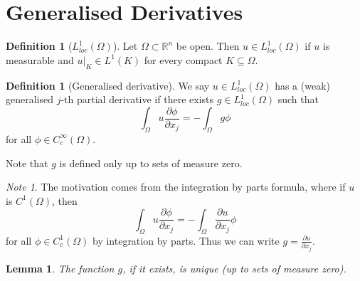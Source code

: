 \documentclass[10pt, oneside, reqno]{amsart}
\theoremstyle{plain}%
\newtheorem{lem}[thm]{Lemma}
\numberwithin{equation}{section}
\theoremstyle{definition}
\newtheorem{defn}[thm]{Definition}
\theoremstyle{remark}
\newtheorem*{note}{Note}
\newcommand{\R}{\mathbb{R}}
\begin{document}
\section{Generalised Derivatives} %
\label{sec:generalised_derivatives}

\begin{defn}[$L^1_{loc}(\Omega)$]
	Let $\Omega \subset \R^n$ be open.  Then $u \in L^1_{loc}(\Omega)$ if $u$ is measurable and $u|_K \in L^1(K)$ for every compact $K \subseteq \Omega$. 
\end{defn}

\begin{defn}[Generalised derivative]
	We say $u \in L^1_{loc}(\Omega)$ has a (weak) generalised $j$-th partial derivative if there exists $g \in L^1_{loc}(\Omega)$ such that \begin{equation}
	\label{eq:generalised_derivative}
		\int_\Omega u \frac{\partial \phi}{\partial x_j} = - \int_\Omega g \phi
	\end{equation}
	for all $\phi \in C_c^\infty(\Omega)$.
	
	Note that $g$ is defined only up to sets of measure zero.
\end{defn}

\begin{note}
	The motivation comes from the integration by parts formula, where if $u$ is $C^1(\Omega)$, then \[
		\int_\Omega u \frac{\partial \phi}{\partial x_j} = - \int_\Omega \frac{\partial u}{\partial x_j} \phi
	\] for all $\phi \in C^1_c(\Omega)$ by integration by parts. Thus we can write $g = \frac{\partial u}{\partial x_j}$.   
\end{note}

\begin{lem}
	\label{lem:uniqueness_of_generalised_derivative}
	The function $g$, if it exists, is unique (up to sets of measure zero).  
\end{lem}
\end{document}
